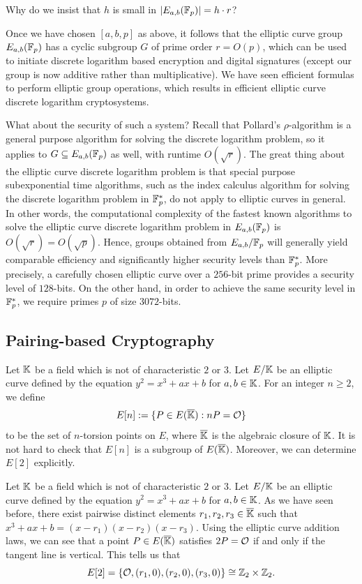 \begin{exercise}
    Why do we insist that $h$ is small in $|E_{a,b}(\mathbb{F}_p)| = h \cdot r$? 
\end{exercise}

Once we have chosen $[a, b, p]$ as above, it follows that the elliptic curve 
group $E_{a,b}(\mathbb{F}_p)$ has a cyclic subgroup $G$ of prime order $r = O(p)$, 
which can be used to initiate discrete logarithm based encryption and digital
signatures (except our group is now additive rather than multiplicative). 
We have seen efficient formulas to perform elliptic group operations, which 
results in efficient elliptic curve discrete logarithm cryptosystems. 

What about the security of such a system? Recall that Pollard's $\rho$-algorithm 
is a general purpose algorithm for solving the discrete logarithm problem, 
so it applies to $G \subseteq E_{a,b}(\mathbb{F}_p)$ as well, with runtime $O(\sqrt r)$. 
The great thing about the elliptic curve discrete logarithm problem is that 
special purpose subexponential time algorithms, such as the index calculus 
algorithm for solving the discrete logarithm problem in $\mathbb{F}_p^*$, do 
not apply to elliptic curves in general. In other words, the computational 
complexity of the fastest known algorithms to solve the elliptic curve 
discrete logarithm problem in $E_{a,b}(\mathbb{F}_p)$ is $O(\sqrt r) = O(\sqrt p)$. 
Hence, groups obtained from $E_{a,b}/\mathbb{F}_p$ will generally yield comparable 
efficiency and significantly higher security levels than $\mathbb{F}_p^*$. 
More precisely, a carefully chosen elliptic curve over a $256$-bit prime 
provides a security level of $128$-bits. On the other hand, in order to 
achieve the same security level in $\mathbb{F}_p^*$, we require primes $p$ of 
size $3072$-bits. 

\subsection{Pairing-based Cryptography}
Let $\mathbb{K}$ be a field which is not of characteristic $2$ or $3$. Let 
$E/\mathbb{K}$ be an elliptic curve defined by the equation $y^2 = x^3 + ax + b$ 
for $a, b \in \mathbb{K}$. For an integer $n \geq 2$, we define 
\[ E[n] := \{P \in E(\overline{\mathbb{K}}) : nP = {\cal O}\} \] 
to be the set of $n$-torsion points on $E$, where $\overline{\mathbb{K}}$ is the 
algebraic closure of $\mathbb{K}$. It is not hard to check that $E[n]$ is a subgroup of 
$E(\overline{\mathbb{K}})$. Moreover, we can determine $E[2]$ explicitly. 

\begin{exmp}
    Let $\mathbb{K}$ be a field which is not of characteristic $2$ or $3$. Let 
    $E/\mathbb{K}$ be an elliptic curve defined by the equation $y^2 = x^3 + ax + b$ 
    for $a, b \in \mathbb{K}$. As we have seen before, there exist pairwise 
    distinct elements $r_1, r_2, r_3 \in \overline{\mathbb{K}}$ such that 
    $x^3 + ax + b = (x - r_1)(x - r_2)(x - r_3)$. Using the elliptic curve 
    addition laws, we can see that a point $P \in E(\overline{\mathbb{K}})$ 
    satisfies $2P = {\cal O}$ if and only if the tangent line is vertical. 
    This tells us that 
    \[ E[2] = \{{\cal O}, (r_1, 0), (r_2, 0), (r_3, 0)\} \cong \mathbb{Z}_2 \times \mathbb{Z}_2. \] 
\end{exmp}

